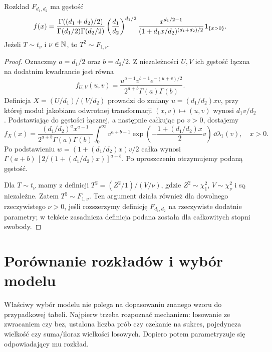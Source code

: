 \begin{stwierdzenie}
Rozkład $F_{d_1,d_2}$ ma gęstość
\[
f(x)=\frac{\Gamma((d_1+d_2)/2)}
{\Gamma(d_1/2)\Gamma(d_2/2)}
\left(\frac{d_1}{d_2}\right)^{d_1/2}
\frac{x^{d_1/2-1}}{(1+d_1x/d_2)^{(d_1+d_2)/2}}
\mathbf{1}_{\{x>0\}}.
\]
Jeżeli $T\sim t_\nu$ i $\nu\in\mathbb{N}$, to $T^2\sim F_{1,\nu}$.
\end{stwierdzenie}
\begin{proof}
Oznaczmy $a=d_1/2$ oraz $b=d_2/2$.
Z niezależności $U,V$ ich gęstość łączna na dodatnim
kwadrancie jest równa
\[
f_{U,V}(u,v)=\frac{u^{a-1}v^{b-1}e^{-(u+v)/2}}
{2^{a+b}\Gamma(a)\Gamma(b)}.
\]
Definicja $X=(U/d_1)/(V/d_2)$ prowadzi do zmiany
$u=(d_1/d_2)xv$, przy której moduł jakobianu
odwrotnej transformacji $(x,v)\mapsto(u,v)$ wynosi
$d_1v/d_2$. Podstawiając do gęstości łącznej,
a następnie całkując po $v>0$, dostajemy
\[
f_X(x)=\frac{(d_1/d_2)^a x^{a-1}}
{2^{a+b}\Gamma(a)\Gamma(b)}
\int_0^\infty v^{a+b-1}
\exp\!\left(-\frac{1+(d_1/d_2)x}{2}v\right)
\,\dd\lambda_1(v),\quad x>0.
\]
Po podstawieniu $w=(1+(d_1/d_2)x)v/2$
całka wynosi
$\Gamma(a+b)\,[2/(1+(d_1/d_2)x)]^{a+b}$.
Po uproszczeniu otrzymujemy podaną gęstość.

Dla $T\sim t_\nu$ mamy z definicji
$T^2=(Z^2/1)/(V/\nu)$, gdzie
$Z^2\sim\chi_1^2$, $V\sim\chi_\nu^2$ i są niezależne.
Zatem $T^2\sim F_{1,\nu}$. Ten argument działa
również dla dowolnego rzeczywistego $\nu>0$, jeśli
rozszerzymy definicję $F_{d_1,d_2}$ na rzeczywiste
dodatnie parametry; w tekście zasadnicza definicja
podana została dla całkowitych stopni swobody.
\end{proof}

\section{Porównanie rozkładów i wybór modelu}
Właściwy wybór modelu nie polega na dopasowaniu znanego wzoru
do przypadkowej tabeli. Najpierw trzeba rozpoznać mechanizm:
losowanie ze zwracaniem czy bez, ustalona liczba prób czy czekanie
na sukces, pojedyncza wielkość czy suma/iloraz wielkości losowych.
Dopiero potem parametryzuje się odpowiadający mu rozkład.

